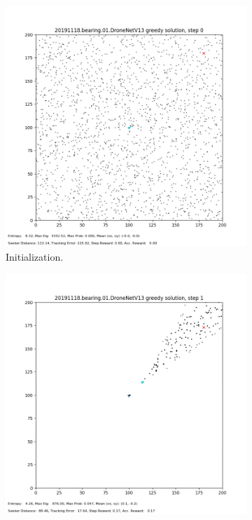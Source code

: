 \documentclass[10pt,twocolumn,letterpaper]{article}
\begin{document}
\begin{figure}[h!]
  \centering
  \begin{subfigure}[b]{0.48\linewidth}
    \includegraphics[width=\linewidth]{images/first.png}
    \caption{Initialization.}
  \end{subfigure}
  \begin{subfigure}[b]{0.48\linewidth}
    \includegraphics[width=\linewidth]{images/second.png}

\end{subfigure}
\end{figure}
\end{document}
